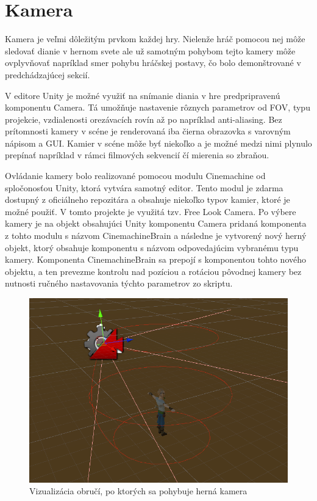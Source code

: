 \documentclass[slovak, master]{diploma}
\begin{document}
\section{Kamera}
\label{sec:Camera}

Kamera je veľmi dôležitým prvkom každej hry. Nielenže hráč pomocou nej môže sledovať dianie v hernom svete ale už samotným pohybom tejto kamery môže ovplyvňovať napríklad smer pohybu hráčskej postavy, čo bolo demonštrované v predchádzajúcej sekcií. 

V editore Unity je možné využiť na snímanie diania v hre predpripravenú komponentu Camera. Tá umožňuje nastavenie rôznych parametrov od FOV, typu projekcie, vzdialenosti orezávacích rovín až po napríklad anti-aliasing. Bez prítomnosti kamery v scéne je renderovaná iba čierna obrazovka s varovným nápisom a GUI. Kamier v scéne môže byť niekoľko a je možné medzi nimi plynulo prepínať napríklad v rámci filmových sekvencií čí mierenia so zbraňou.

Ovládanie kamery bolo realizované pomocou modulu Cinemachine od spločonosťou Unity, ktorá vytvára samotný editor. Tento modul je zdarma dostupný z oficiálneho repozitára a obsahuje niekoľko typov kamier, ktoré je možné použiť. V tomto projekte je využitá tzv. Free Look Camera. Po výbere kamery je na objekt obsahujúci Unity komponentu Camera pridaná komponenta z tohto modulu s názvom CinemachineBrain a následne je vytvorený nový herný objekt, ktorý obsahuje komponentu s názvom odpovedajúcim vybranému typu kamery. Komponenta CinemachineBrain sa prepojí s komponentou tohto nového objektu, a ten prevezme kontrolu nad pozíciou a rotáciou pôvodnej kamery bez nutnosti ručného nastavovania týchto parametrov zo skriptu.

\begin{figure}[!htbp]
	\centering
	\includegraphics[width=.7\textwidth]{Figures/obruce.png}
	\caption{Vizualizácia obručí, po ktorých sa pohybuje herná kamera}
	\label{pic:Cinemachine}
\end{figure}
\end{document}
